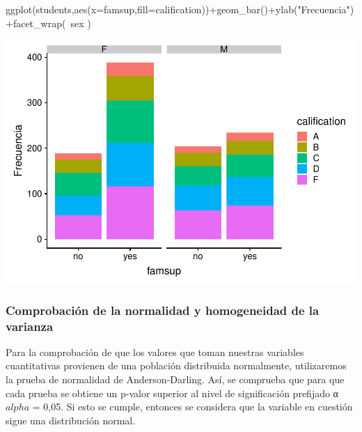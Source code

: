 \documentclass[]{article}
\newenvironment{Shaded}{\begin{snugshade}}{\end{snugshade}}
\newcommand{\DataTypeTok}[1]{\textcolor[rgb]{0.87,0.87,0.75}{#1}}
\newcommand{\KeywordTok}[1]{\textcolor[rgb]{0.94,0.87,0.69}{#1}}
\newcommand{\NormalTok}[1]{\textcolor[rgb]{0.80,0.80,0.80}{#1}}
\newcommand{\OperatorTok}[1]{\textcolor[rgb]{0.94,0.94,0.82}{#1}}
\newcommand{\StringTok}[1]{\textcolor[rgb]{0.80,0.58,0.58}{#1}}
\begin{document}
\begin{Shaded}
\begin{Highlighting}[]
\KeywordTok{ggplot}\NormalTok{(students,}\KeywordTok{aes}\NormalTok{(}\DataTypeTok{x=}\NormalTok{famsup,}\DataTypeTok{fill=}\NormalTok{calification))}\OperatorTok{+}\KeywordTok{geom_bar}\NormalTok{()}\OperatorTok{+}\KeywordTok{ylab}\NormalTok{(}\StringTok{"Frecuencia"}\NormalTok{)}\OperatorTok{+}\KeywordTok{facet_wrap}\NormalTok{(}\OperatorTok{~}\NormalTok{sex )}
\end{Highlighting}
\end{Shaded}

\includegraphics{Practica2_files/figure-latex/unnamed-chunk-27-2.pdf}

\hypertarget{comprobacion-de-la-normalidad-y-homogeneidad-de-la-varianza}{%
\subsubsection{Comprobación de la normalidad y homogeneidad de la
varianza}\label{comprobacion-de-la-normalidad-y-homogeneidad-de-la-varianza}}

Para la comprobación de que los valores que toman nuestras variables
cuantitativas provienen de una población distribuida normalmente,
utilizaremos la prueba de normalidad de Anderson-Darling. Así, se
comprueba que para que cada prueba se obtiene un p-valor superior al
nivel de significación prefijado α \(alpha\) = 0,05. Si esto se cumple,
entonces se considera que la variable en cuestión sigue una distribución
normal.
\end{document}
